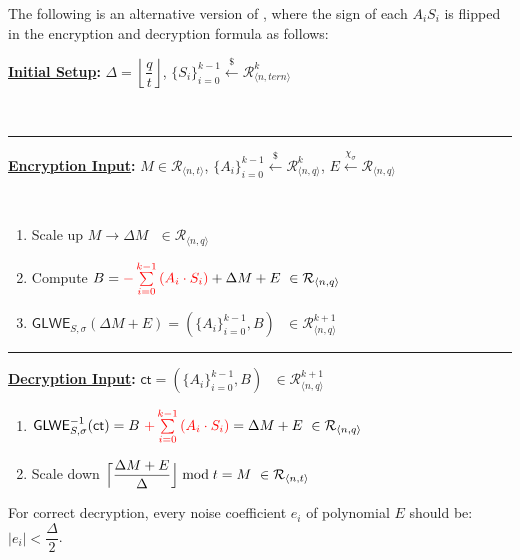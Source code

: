 The following is an alternative version of \tboxlabel{\ref*{subsec:glwe-enc}}, where the sign of each $A_iS_i$ is flipped in the encryption and decryption formula as follows: 

\begin{tcolorbox}[title={\textbf{\tboxlabel{\ref*{subsec:glwe-alternative}} An Alternative GLWE Cryptosystem}}]

\textbf{\underline{Initial Setup}:} $\Delta = \left\lfloor\dfrac{q}{t}\right\rfloor$, $\{S_i\}_{i=0}^{k-1} \xleftarrow{\$} \mathcal{R}_{\langle n, \textit{tern} \rangle}^k$

$ $

\par\noindent\rule{\textwidth}{0.4pt}


\textbf{\underline{Encryption Input}:} $M \in \mathcal{R}_{\langle n, t \rangle}$, $\{A_i\}_{i=0}^{k-1} \xleftarrow{\$} \mathcal{R}_{\langle n,q \rangle}^{k}$, $E \xleftarrow{\chi_\sigma} \mathcal{R}_{\langle n,q \rangle}$

$ $

\begin{enumerate}
\item Scale up $M \longrightarrow \Delta M \text { } \in \mathcal{R}_{\langle n, q\rangle}$

\item Compute $B = \textcolor{red}{-\sum\limits_{i=0}^{k-1}{(A_i \cdot S_i)}} + \Delta  M + E \text{ } \in \mathcal{R}_{\langle n,q \rangle}$

\item $\textsf{GLWE}_{S,\sigma}(\Delta M + E) = (\{A_i\}_{i=0}^{k-1}, B) \text{ } \in \mathcal{R}_{\langle n,q \rangle}^{k + 1}$ 

\end{enumerate}

\par\noindent\rule{\textwidth}{0.4pt}


\textbf{\underline{Decryption Input}:} $\textsf{ct} = (\{A_i\}_{i=0}^{k-1}, B) \text{ } \in \mathcal{R}_{\langle n,q \rangle}^{k + 1}$

\begin{enumerate}
\item $\textsf{GLWE}^{-1}_{S,\sigma}(\textsf{ct}) = B \text{ } \textcolor{red}{ + \sum\limits_{i=0}^{k-1}{(A_i \cdot S_i)}} = \Delta  M + E \text{ } \in \mathcal{R}_{\langle n,q \rangle}$

\item Scale down 
$\Bigl\lceil \dfrac{ \Delta  M + E }{\Delta}\Bigr\rfloor \bmod t = M  \text{ } \in \mathcal{R}_{\langle n, t \rangle}$

\end{enumerate}

For correct decryption, every noise coefficient $e_i$ of polynomial $E$ should be: $|e_i| < \dfrac{\Delta}{2}$.

\end{tcolorbox}

